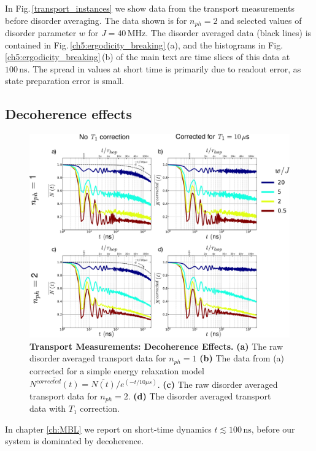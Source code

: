 In Fig.\,\ref{transport_instances} we show data from the transport measurements before disorder averaging.  The data shown is for $n_{ph}=2$ and selected values of disorder parameter $w$ for $J = 40 \, \text{MHz}$.
The disorder averaged data (black lines) is contained in Fig.\,\ref{ch5:ergodicity_breaking}\,(a), and the histograms in Fig.\,\ref{ch5:ergodicity_breaking}\,(b) of the main text are time slices of this data at $100 \, \text{ns}$.
The spread in values at short time is primarily due to readout error, as state preparation error is small.

\subsection{Decoherence effects}
\begin{figure}[h]
\label{decoherence_effects}
\centering
\includegraphics[width=170mm, keepaspectratio]{./PDF/fs5_190919_1208p.pdf}%
\caption{\textbf{Transport Measurements:  Decoherence Effects.}
\textbf{(a)} The raw disorder averaged transport data for $n_{ph}=1$
\textbf{(b)} The data from (a) corrected for a simple energy relaxation model $\overline{N^{corrected} \left( t \right)} = \overline{N \left( t \right)} / e^{\left( -t/10 \mu s \right) }$.
\textbf{(c)} The raw disorder averaged transport data for $n_{ph}=2$.
\textbf{(d)} The disorder averaged transport data with $T_{1}$ correction.
\label{decoherence_effects}
}\end{figure}
In chapter \ref{ch:MBL} we report on short-time dynamics $t\lesssim 100 \, \text{ns}$, before our system is dominated by decoherence.
